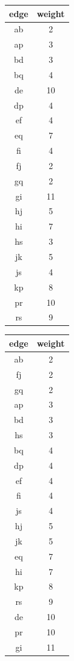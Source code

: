 \documentclass{article}
\begin{document}
\begin{enumerate}
    \begin{multicols}{2}
        \begin{center}
        \begin{tabular}{| c | c |}
            \hline
            edge & weight  \\ \hline
            ab & 2  \\
            ap & 3  \\
            bd & 3  \\
            bq & 4  \\
            de & 10 \\
            dp & 4  \\
            ef & 4  \\
            eq & 7  \\
            fi & 4  \\
            fj & 2  \\
            gq & 2  \\
            gi & 11 \\
            hj & 5  \\
            hi & 7  \\
            hs & 3  \\
            jk & 5  \\
            js & 4  \\
            kp & 8  \\
            pr & 10 \\
            rs & 9 \\ \hline
        \end{tabular}

        \columnbreak
        \begin{tabular}{| c | c |}
            \hline
            edge & weight  \\ \hline
            ab & 2  \\
            fj & 2  \\
            gq & 2  \\
            ap & 3  \\
            bd & 3  \\
            hs & 3  \\
            bq & 4  \\
            dp & 4  \\
            ef & 4  \\
            fi & 4  \\
            js & 4  \\
            hj & 5  \\
            jk & 5  \\
            eq & 7  \\
            hi & 7  \\
            kp & 8  \\
            rs & 9 \\
            de & 10 \\
            pr & 10 \\
            gi & 11 \\ \hline
        \end{tabular}
        \end{center}
    \end{multicols}


\end{enumerate}
\end{document}
